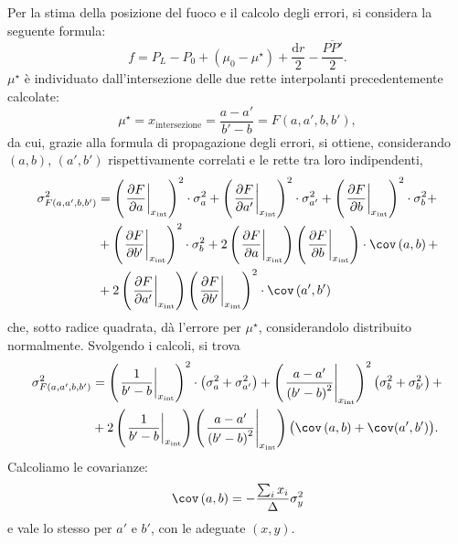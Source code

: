 
Per la stima della posizione del fuoco e il calcolo degli errori, si considera la seguente formula:
\begin{equation} 
f = P_L - P_0 + \left(\mu _0 - \mu ^{\star}\right) + \frac{\mathrm{d}r}{2} - \frac{\overline{PP'}}{2}.
\end{equation}
$ \mu ^{\star} $ \`e individuato dall'intersezione delle due rette interpolanti precedentemente calcolate:
\[ \mu ^{\star} = x_{\mathrm{intersezione}} = \frac{a - a'}{b' - b} = F\left(a, a', b, b'\right), \]
da cui, grazie alla formula di propagazione degli errori, si ottiene, considerando $\left(a, b\right)$, $\left(a', b'\right)$ rispettivamente correlati e le rette tra loro indipendenti,
\begin{equation*}
\begin{split} %
	\sigma^2_{F\left(a, a', b, b'\right)}  &= \left(\left.\frac{\partial F}{\partial a}\right|_{x_{\mathrm{int}}}\right)^2 \cdot \sigma^2_{a} + \left(\left.\frac{\partial F}{\partial a'}\right|_{x_{\mathrm{int}}}\right)^2 \cdot \sigma^2_{a'} + \left(\left.\frac{\partial F}{\partial b}\right|_{x_{\mathrm{int}}}\right)^2 \cdot \sigma^2_{b} +\\
								&+ \left(\left.\frac{\partial F}{\partial b'}\right|_{x_{\mathrm{int}}}\right)^2 \cdot \sigma^2_{b} + 2\left(\left.\frac{\partial F}{\partial a}\right|_{x_{\mathrm{int}}}\right)\left(\left.\frac{\partial F}{\partial b}\right|_{x_{\mathrm{int}}}\right) \cdot \cov\left(a, b\right) + \\
								&+ 2\left(\left.\frac{\partial F}{\partial a'}\right|_{x_{\mathrm{int}}}\right)\left(\left.\frac{\partial F}{\partial b'}\right|_{x_{\mathrm{int}}}\right)^2 \cdot \cov \left(a', b'\right)
\end{split}
\end{equation*}
che, sotto radice quadrata, d\`a l'errore per $ \mu ^{\star} $, considerandolo distribuito normalmente.
Svolgendo i calcoli, si trova
\begin{equation}
\begin{split}
\sigma^2_{F\left(a, a', b, b'\right)}  &= \left(\left.\frac{1}{b'- b}\right|_{x_{\mathrm{int}}}\right)^2 \cdot \left(\sigma^2_{a} + \sigma^2_{a'}\right) + \left(\left.\frac{a - a'}{\left(b' - b\right)^2}\right|_{x_{\mathrm{int}}}\right)^2 \left(\sigma^2_{b} + \sigma^2_{b'}\right) + \\
							&+ 2 \left(\left.\frac{1}{b'- b}\right|_{x_{\mathrm{int}}}\right) \left(\left.\frac{a - a'}{\left(b' - b\right)^2}\right|_{x_{\mathrm{int}}}\right) \big(\cov\left(a, b\right) + \cov(a', b') \big).
\end{split}
\end{equation}
Calcoliamo le covarianze:
\[ \cov\left(a, b\right) = -\frac{\sum_{i} x_i}{\Delta}\sigma_y^2 \] %
e vale lo stesso per $a'$ e $b'$, con le adeguate $\left(x, y\right)$.

